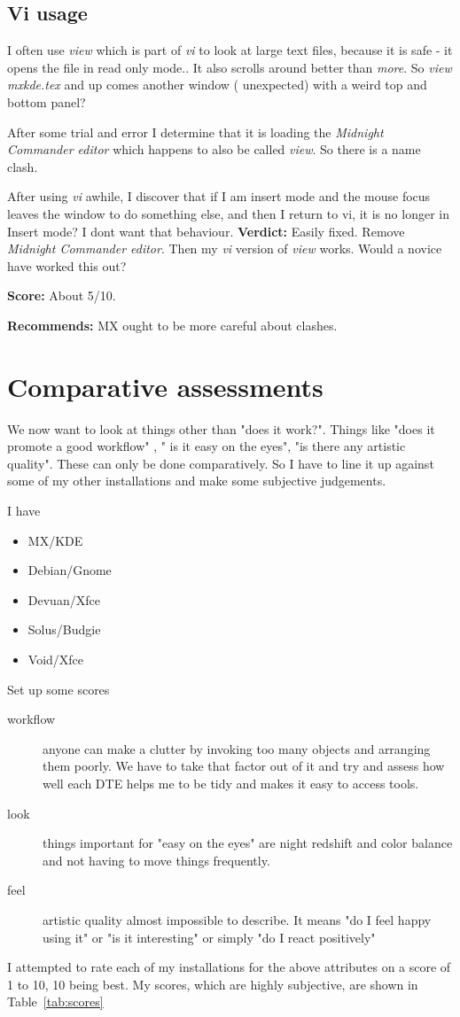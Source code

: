 \documentclass{article}  %
\begin{document}
\subsection{Vi usage}
I often use {\em view} which is part of {\em vi} to look at large text files, because it is safe - it opens the file in read only mode.. It also scrolls around better than {\em more}. So {\em view mxkde.tex} and up comes another window ( unexpected) with a weird top and bottom panel? 

After some trial and error I determine that it is loading the {\em Midnight Commander editor} which happens to also be called {\em view}. So there is a name clash.

After using {\em vi} awhile, I discover that if I am insert mode and the mouse focus leaves the window to do something else, and then I return to vi, it is no longer in Insert mode? I dont want that behaviour. 
{\bf Verdict:} Easily fixed. Remove {\em Midnight Commander editor}. Then my {\em vi} version of {\em view} works. Would a novice have worked this out?

{\bf Score:} About 5/10. 

{\bf Recommends:} MX ought to be more careful about clashes.

\section{Comparative assessments}
We now want to look at things other than "does it work?". Things like "does it promote a good workflow" , " is it easy on the eyes", "is there any artistic quality". These can only be done comparatively. So I have to line it up against some of my other installations and make some subjective judgements.

I have
\begin{itemize}
\item MX/KDE
\item Debian/Gnome
\item Devuan/Xfce
\item Solus/Budgie
\item Void/Xfce
\end{itemize}
Set up some scores
\begin{description}
\item[workflow] anyone can make a clutter by invoking too many objects and arranging them poorly. We have to take that factor out of it  and try and assess how well each DTE helps me to be tidy and makes it easy to access tools. 
\item[look] things important for "easy on the eyes" are night redshift and color balance and not having to move things frequently.
\item[feel] artistic quality almost impossible to describe. It means "do I feel happy using it" or "is it interesting" or simply "do I react positively"
\end{description}
 I attempted to rate each of my installations for the above attributes on a score of 1 to 10, 10 being best. My scores, which are highly subjective, are shown in Table~\ref{tab:scores}

\end{document}
